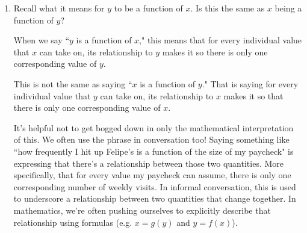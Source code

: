 \documentclass[main]{subfiles}
\begin{document}
\begin{enumerate}
\begin{enumerate}
\begin{solution}
    Let's review our examples in order. We want to see if we can now isolate $x$ and have only one value represented on the other side of the equals sign.
    \begin{itemize}
        \item $x^2+y^2=25$ runs into the same trouble that we had when we tried to isolate $y$, $x=\pm \sqrt{25-y^2}$, which means that $x$ cannot be expressed as $x=g(y)$, because there are multiple values represented by the $\pm$ written on the right-hand side of the equation. 
        \item $xy=10$ can be written as $x=\frac{10}{y}$, so this can be written as $x=g(y)$
        \item $y=\pi x^2$ runs into similar challenges as our first example. When we try to isolate $x$, we get $x=\pm \sqrt{y}{\pi}$ and we have two values possible for the quantity on the right-hand side, so we cannot rewrite this as $x=g(y)$.
        \item $3x+2y=4$ can be written as $x=-\frac{2}{3}y+\frac{4}{3}$, so it can be written in the format $x=g(y)$
        \item $y=x^2$ runs into difficulty when expressing $x$ entirely in terms of $y$. After isolating, we have $x=\pm \sqrt{y}$. With the multiple values represented on the right hand side, this means we cannot rewrite in the form $x=g(y)$.
    \end{itemize}
\end{solution}
\end{enumerate}

\item 
\begin{problem}
    Recall what it means for $y$ to be a function of $x$. Is this the same as $x$ being a function of $y$?
\end{problem}

\begin{solution}
    When we say ``$y$ is a function of $x$," this means that for every individual value that $x$ can take on, its relationship to $y$ makes it so there is only one corresponding value of $y$. 
    
    This is not the same as saying ``$x$ is a function of $y$." That is saying for every individual value that $y$ can take on, its relationship to $x$ makes it so that there is only one corresponding value of $x$. 
    
    It's helpful not to get bogged down in only the mathematical interpretation of this. We often use the phrase in conversation too! Saying something like ``how frequently I hit up Felipe's is a function of the size of my paycheck" is expressing that there's a relationship between those two quantities. More specifically, that for every value my paycheck can assume, there is only one corresponding number of weekly visits. In informal conversation, this is  used to underscore a relationship between two quantities that change together. In mathematics, we're often pushing ourselves to explicitly describe that relationship using formulas (e.g. $x=g(y)$ and $y=f(x)$).
    

\end{solution}
\end{enumerate}
\end{document}

